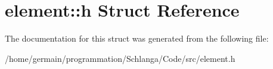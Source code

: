 \hypertarget{structelement_1_1h}{\section{element\-:\-:h Struct Reference}
\label{structelement_1_1h}
}


The documentation for this struct was generated from the following file\-:\begin{DoxyCompactItemize}
\item 
/home/germain/programmation/\-Schlanga/\-Code/src/element.\-h\end{DoxyCompactItemize}
